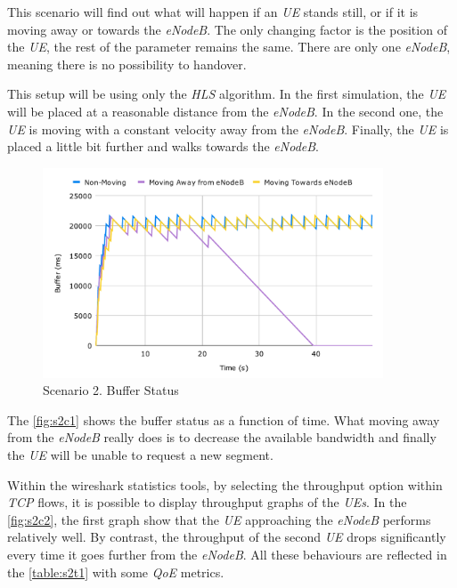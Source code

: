 This scenario will find out what will happen if an \textit{UE} stands still, or if it is moving away
or towards the \textit{eNodeB}. The only changing factor is the position of the \textit{UE}, 
the rest of the parameter remains the same. There are only one \textit{eNodeB}, meaning there 
is no possibility to handover.

This setup will be using only the \textit{HLS} algorithm. In the first simulation, the \textit{UE}
will be placed at a reasonable distance from the \textit{eNodeB}. In the second one, the \textit{UE}
is moving with a constant velocity away from the \textit{eNodeB}. Finally, the \textit{UE} is placed 
a little bit further and walks towards the \textit{eNodeB}.

\begin{figure}[h]
    \centering
    \includegraphics[width=0.9\textwidth]{img/s2c1.pdf}
    \caption{Scenario 2. Buffer Status}
    \label{fig:s2c1}
\end{figure}

The \autoref{fig:s2c1} shows the buffer status as a function of time. What moving away from 
the \textit{eNodeB} really does is to decrease the available bandwidth and finally the \textit{UE}
will be unable to request a new segment. 

Within the wireshark statistics tools, by selecting the throughput option within \textit{TCP} flows, 
it is possible to display throughput graphs of the \textit{UEs}. In the \autoref{fig:s2c2}, the first
graph show that the \textit{UE} approaching the \textit{eNodeB} performs relatively well. By contrast,
the throughput of the second \textit{UE} drops significantly every time it goes further from the \textit{eNodeB}.
All these behaviours are reflected in the \autoref{table:s2t1} with some \textit{QoE} metrics.

